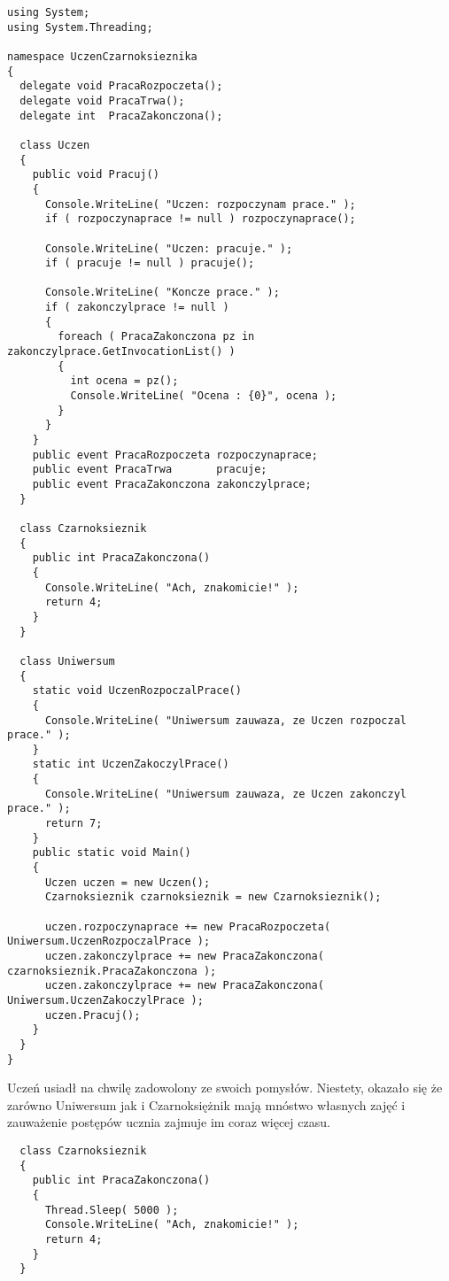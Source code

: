 {\begin{scriptsize}
\begin{verbatim}
using System;
using System.Threading;

namespace UczenCzarnoksieznika
{	
  delegate void PracaRozpoczeta();
  delegate void PracaTrwa();
  delegate int  PracaZakonczona();
  
  class Uczen
  {
    public void Pracuj()
    {
      Console.WriteLine( "Uczen: rozpoczynam prace." );
      if ( rozpoczynaprace != null ) rozpoczynaprace();
  		
      Console.WriteLine( "Uczen: pracuje." );
      if ( pracuje != null ) pracuje();
  	  
      Console.WriteLine( "Koncze prace." );
      if ( zakonczylprace != null ) 
      {
        foreach ( PracaZakonczona pz in zakonczylprace.GetInvocationList() )      	
        {
          int ocena = pz();
          Console.WriteLine( "Ocena : {0}", ocena );
        }
      }
    }
    public event PracaRozpoczeta rozpoczynaprace;
    public event PracaTrwa       pracuje;
    public event PracaZakonczona zakonczylprace;
  }
  
  class Czarnoksieznik 
  {
    public int PracaZakonczona() 
    {
      Console.WriteLine( "Ach, znakomicie!" );
      return 4;
    }
  }
  
  class Uniwersum
  {  	
    static void UczenRozpoczalPrace()
    {
      Console.WriteLine( "Uniwersum zauwaza, ze Uczen rozpoczal prace." );      
    }
    static int UczenZakoczylPrace()
    {
      Console.WriteLine( "Uniwersum zauwaza, ze Uczen zakonczyl prace." );      
      return 7;
    }
    public static void Main()
    {
      Uczen uczen = new Uczen();
      Czarnoksieznik czarnoksieznik = new Czarnoksieznik();
  		
      uczen.rozpoczynaprace += new PracaRozpoczeta( Uniwersum.UczenRozpoczalPrace );    	
      uczen.zakonczylprace += new PracaZakonczona( czarnoksieznik.PracaZakonczona );  		
      uczen.zakonczylprace += new PracaZakonczona( Uniwersum.UczenZakoczylPrace );    	
      uczen.Pracuj();
    }
  }
}
\end{verbatim}
\end{scriptsize}

Uczeń usiadł na chwilę zadowolony ze swoich pomysłów. Niestety, okazało się że zarówno Uniwersum jak
i Czarnoksiężnik mają mnóstwo własnych zajęć i zauważenie postępów ucznia zajmuje im coraz
więcej czasu.

\begin{scriptsize}
\begin{verbatim}
  class Czarnoksieznik 
  {
    public int PracaZakonczona() 
    {
      Thread.Sleep( 5000 );
      Console.WriteLine( "Ach, znakomicie!" );
      return 4;
    }
  }
  

\end{verbatim}
\end{scriptsize}}
